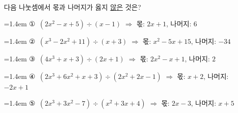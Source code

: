다음 나눗셈에서 몫과 나머지가 옳지 \underline{않은} 것은?
\par\medskip\par\noindent\hangindent=1.4em {\small ①}\ $(2x^2-x+5)\div(x-1)$ $\Rightarrow$ 몫: $2x+1$, 나머지: $6$\par\noindent\hangindent=1.4em {\small ②}\ $(x^3-2x^2+11)\div(x+3)$ $\Rightarrow$ 몫: $x^2-5x+15$, 나머지: $-34$\par\noindent\hangindent=1.4em {\small ③}\ $(4x^3+x+3)\div(2x+1)$ $\Rightarrow$ 몫: $2x^2-x+1$, 나머지: $2$\par\noindent\hangindent=1.4em {\small ④}\ $(2x^3+6x^2+x+3)\div(2x^2+2x-1)$ $\Rightarrow$ 몫: $x+2$, 나머지: $-2x+1$\par\noindent\hangindent=1.4em {\small ⑤}\ $(2x^3+3x^2-7)\div(x^2+3x+4)$ $\Rightarrow$ 몫: $2x-3$, 나머지: $x+5$\par\medskip
